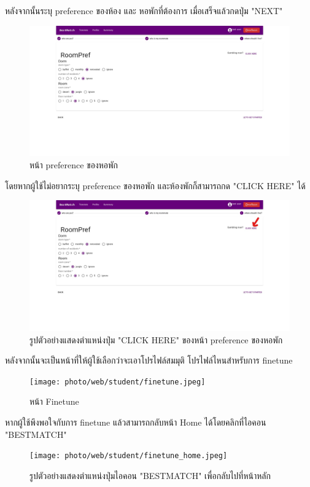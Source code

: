 หลังจากนั้นระบุ preference ของห้อง และ หอพักที่ต้องการ เมื่อเสร็จแล้วกดปุ่ม "NEXT"
\begin{figure}[h]
  \begin{center}
    \includegraphics[width=\linewidth]{photo/web/student/dorm-def.jpeg}
  \end{center}
  \caption{หน้า preference ของหอพัก}
\end{figure}
%
\newline
โดยหากผู้ใช้ไม่อยากระบุ preference ของหอพัก และห้องพักก็สามารถกด "CLICK HERE" ได้
\begin{figure}[h]
  \begin{center}
    \includegraphics[width=\linewidth]{photo/web/student/dorm-gambler.jpeg}
  \end{center}
  \caption{รูปตัวอย่างแสดงตำแหน่งปุ่ม "CLICK HERE" ของหน้า preference ของหอพัก}
\end{figure}
\newpage

หลังจากนั้นจะเป็นหน้าที่ให้ผู้ใช้เลือกว่าจะเอาโปรไฟล์สมมุติ โปรไฟล์ไหนสำหรับการ finetune
\begin{figure}[ht]
  \begin{center}
    \texttt{[image: photo/web/student/finetune.jpeg]}
  \end{center}
  \caption{หน้า Finetune}
\end{figure} 
%
\newline
หากผู้ใช้พึงพอใจกับการ finetune แล้วสามารถกลับหน้า Home ได้โดยคลิกที่ไอคอน "BESTMATCH"
\begin{figure}[ht]
  \begin{center}
    \texttt{[image: photo/web/student/finetune\_home.jpeg]}
  \end{center}
  \caption{รูปตัวอย่างแสดงตำแหน่งปุ่มไอคอน "BESTMATCH" เพื่อกลับไปที่หน้าหลัก}
\end{figure}
\newpage

